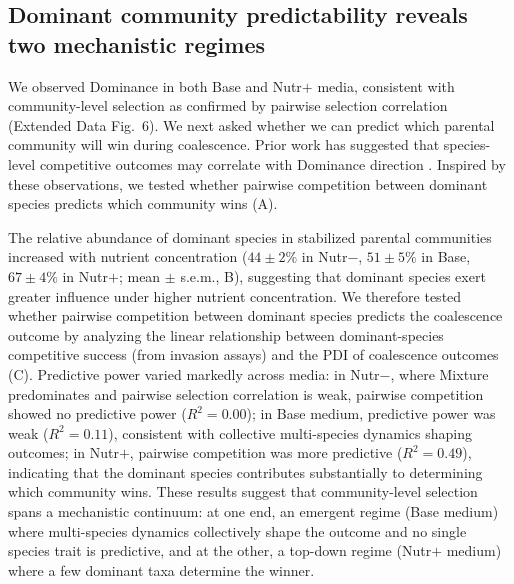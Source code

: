 \subsection{Dominant community predictability reveals two mechanistic regimes}
\label{sec:results:predictability}

We observed Dominance in both Base and Nutr$+$ media, consistent with community-level selection as confirmed by pairwise selection correlation (Extended Data Fig.~6). We next asked whether we can predict which parental community will win during coalescence. Prior work has suggested that species-level competitive outcomes may correlate with Dominance direction \citep{Rillig2015, Castledine2020}. Inspired by these observations, we tested whether pairwise competition between dominant species \citep{Hu2022, Ratzke2020} predicts which community wins (A).

The relative abundance of dominant species in stabilized parental communities increased with nutrient concentration ($44 \pm 2\%$ in Nutr$-$, $51 \pm 5\%$ in Base, $67 \pm 4\%$ in Nutr$+$; mean $\pm$ s.e.m., B), suggesting that dominant species exert greater influence under higher nutrient concentration. We therefore tested whether pairwise competition between dominant species predicts the coalescence outcome by analyzing the linear relationship between dominant-species competitive success (from invasion assays) and the PDI of coalescence outcomes (C). Predictive power varied markedly across media: in Nutr$-$, where Mixture predominates and pairwise selection correlation is weak, pairwise competition showed no predictive power ($R^2 = 0.00$); in Base medium, predictive power was weak ($R^2 = 0.11$), consistent with collective multi-species dynamics shaping outcomes; in Nutr$+$, pairwise competition was more predictive ($R^2 = 0.49$), indicating that the dominant species contributes substantially to determining which community wins. These results suggest that community-level selection spans a mechanistic continuum: at one end, an emergent regime (Base medium) where multi-species dynamics collectively shape the outcome and no single species trait is predictive, and at the other, a top-down regime (Nutr$+$ medium) where a few dominant taxa determine the winner. 

